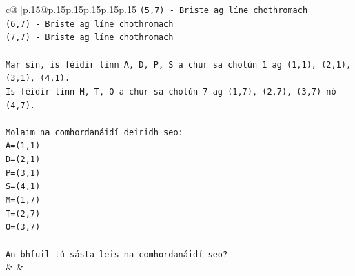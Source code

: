 \documentclass{article}
\begin{document}
{\begin{supertabular}{c@{$\;$}|p{.15\linewidth}@{}p{.15\linewidth}p{.15\linewidth}p{.15\linewidth}p{.15\linewidth}p{.15\linewidth}}
{{{\texttt{(5,7) {-} Briste ag líne chothromach} \\
\texttt{(6,7) {-} Briste ag líne chothromach} \\
\texttt{(7,7) {-} Briste ag líne chothromach} \\
\\ 
\texttt{Mar sin, is féidir linn A, D, P, S a chur sa cholún 1 ag (1,1), (2,1), (3,1), (4,1).} \\
\texttt{Is féidir linn M, T, O a chur sa cholún 7 ag (1,7), (2,7), (3,7) nó (4,7).} \\
\\ 
\texttt{Molaim na comhordanáidí deiridh seo:} \\
\texttt{A=(1,1)} \\
\texttt{D=(2,1)} \\
\texttt{P=(3,1)} \\
\texttt{S=(4,1)} \\
\texttt{M=(1,7)} \\
\texttt{T=(2,7)} \\
\texttt{O=(3,7)} \\
\\ 
\texttt{An bhfuil tú sásta leis na comhordanáidí seo?} \\
            }
        }
    }
    & & \\ \\


\end{supertabular}}
\end{document}
